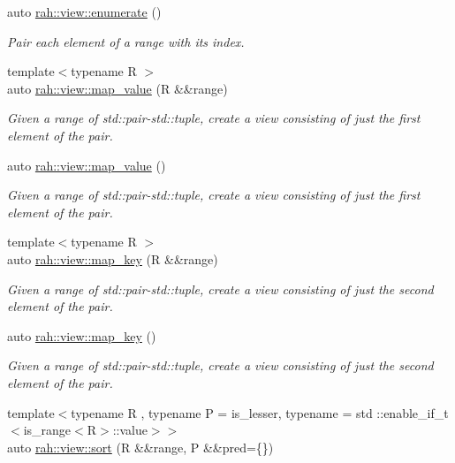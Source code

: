 \begin{DoxyCompactItemize}
auto \mbox{\hyperlink{namespacerah_1_1view_ac815f5494e5a7a182cafb70224b93a6a}{rah\+::view\+::enumerate}} ()
\begin{DoxyCompactList}\small\item\em Pair each element of a range with its index. \end{DoxyCompactList}\item 
{\footnotesize template$<$typename R $>$ }\\auto \mbox{\hyperlink{namespacerah_1_1view_a7896dcebf13a4294254ed87743ba3ad0}{rah\+::view\+::map\+\_\+value}} (R \&\&range)
\begin{DoxyCompactList}\small\item\em Given a range of std\+::pair-\/std\+::tuple, create a view consisting of just the first element of the pair. \end{DoxyCompactList}\item 
auto \mbox{\hyperlink{namespacerah_1_1view_ad11fcca5438e227541594a917a85f77c}{rah\+::view\+::map\+\_\+value}} ()
\begin{DoxyCompactList}\small\item\em Given a range of std\+::pair-\/std\+::tuple, create a view consisting of just the first element of the pair. \end{DoxyCompactList}\item 
{\footnotesize template$<$typename R $>$ }\\auto \mbox{\hyperlink{namespacerah_1_1view_a273917511589d75b32d28b56b7de2655}{rah\+::view\+::map\+\_\+key}} (R \&\&range)
\begin{DoxyCompactList}\small\item\em Given a range of std\+::pair-\/std\+::tuple, create a view consisting of just the second element of the pair. \end{DoxyCompactList}\item 
auto \mbox{\hyperlink{namespacerah_1_1view_aac8d9437b8c96e0e8e972c4c10d584e5}{rah\+::view\+::map\+\_\+key}} ()
\begin{DoxyCompactList}\small\item\em Given a range of std\+::pair-\/std\+::tuple, create a view consisting of just the second element of the pair. \end{DoxyCompactList}\item 
{\footnotesize template$<$typename R , typename P  = is\+\_\+lesser, typename  = std \+::enable\+\_\+if\+\_\+t$<$is\+\_\+range$<$\+R$>$\+::value$>$$>$ }\\auto \mbox{\hyperlink{namespacerah_1_1view_a343ff36ca2b6470f2a55a89dfb4e3dc9}{rah\+::view\+::sort}} (R \&\&range, P \&\&pred=\{\})

\end{DoxyCompactItemize}
